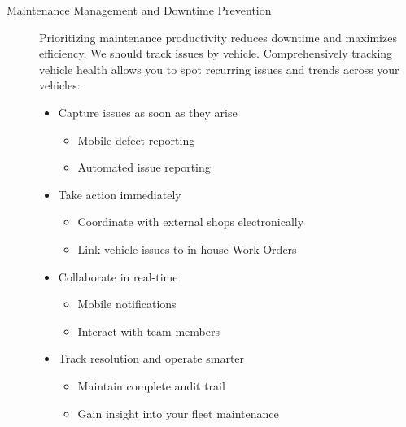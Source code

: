 \begin{description}
\begin{itemize}
\begin{itemize}
        \end{itemize}
    \end{itemize}
    \item [Maintenance Management and Downtime Prevention] Prioritizing maintenance productivity reduces downtime and maximizes efficiency. We should track issues by vehicle. Comprehensively tracking vehicle health allows you to spot recurring issues and trends across your vehicles:
    \begin{itemize}
    \item Capture issues as soon as they arise
        \begin{itemize}
            \item Mobile defect reporting
            \item Automated issue reporting
        \end{itemize}
    \item	Take action immediately
        \begin{itemize}
            \item	Coordinate with external shops electronically
            \item	Link vehicle issues to in-house Work Orders
        \end{itemize}
    \item	Collaborate in real-time
        \begin{itemize}
            \item	Mobile notifications
            \item	Interact with team members
        \end{itemize}
    \item	Track resolution and operate smarter
        \begin{itemize}
            \item	Maintain complete audit trail
        \item	Gain insight into your fleet maintenance
        \end{itemize}
    \end{itemize}
    

\end{description}
